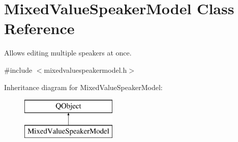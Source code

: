 \hypertarget{classMixedValueSpeakerModel}{\section{Mixed\-Value\-Speaker\-Model Class Reference}
\label{classMixedValueSpeakerModel}
}


Allows editing multiple speakers at once.  




{\ttfamily \#include $<$mixedvaluespeakermodel.\-h$>$}

Inheritance diagram for Mixed\-Value\-Speaker\-Model\-:\begin{figure}[H]
\begin{center}
\leavevmode
\includegraphics[height=2.000000cm]{classMixedValueSpeakerModel}
\end{center}
\end{figure}
